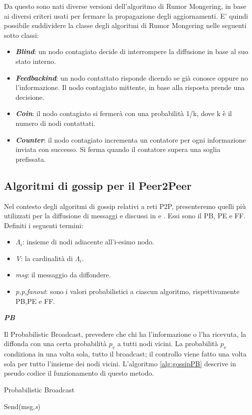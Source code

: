 Da questo sono nati diverse versioni dell'algoritmo di Rumor Mongering, in base ai diversi criteri usati per fermare la propagazione degli aggiornamenti. E' quindi possibile suddividere la classe degli algoritmi di Rumor Mongering nelle seguenti sotto classi:
\begin{itemize}
	\item \textbf{\textit{Blind}}: un nodo contagiato decide di interrompere la diffusione in base al suo stato interno.
	\item \textbf{\textit{Feedbackind}}: un nodo contattato risponde dicendo se già conosce oppure no l'informazione. Il nodo contagiato mittente, in base alla risposta prende una decisione.
	\item \textbf{\textit{Coin}}: il nodo contagiato si fermerà con una probabilità 1/k, dove k è il numero di nodi contattati.
	\item \textbf{\textit{Counter}}: il nodo contagiato incrementa un contatore per ogni informazione inviata con successo. Si ferma quando il contatore supera una soglia prefissata.
\end{itemize}

\subsection{Algoritmi di gossip per il Peer2Peer}
\label{subsec:alg_p2p}
Nel contesto degli algoritmi di gossip relativi a reti \acs{P2P}, presenteremo quelli più utilizzati per la diffusione di messaggi e discussi in \cite{comparisonGAonRT2012} e \cite{comparisonGAonRT2014-ita}. Essi sono il \acf{PB}, \acf{PE} e \acf{FF}. Definiti i seguenti termini:
\begin{itemize}
	\item $ \varLambda_{i} $: insieme di nodi adiacente all'i-esimo nodo.
	\item \textit{V}: la cardinalità di $ \Lambda_{i} $.
	\item \textit{msg}: il messaggio da diffondere.
	\item \textit{p,p,fanout}: sono i valori probabilistici a ciascun algoritmo, rispettivamente PB,PE e FF.
\end{itemize}
\bigskip

\noindent\textbf{\textit{\acf{PB}}}

Il Probabilistic Broadcast, prevedere che chi ha l'informazione o l'ha ricevuta, la diffonda con una certa probabilità $\mathit{p_v}$ a tutti nodi vicini. La probabilità $\mathit{p_v}$ condiziona in una volta sola, tutto il broadcast; il controllo viene fatto una volta sola per tutto l'insieme dei nodi vicini. L'algoritmo \ref{alg:gossipPB} descrive in pseudo codice il funzionamento di questo metodo.
\bigskip
\begin{algorithm}[h]
	\caption{Probabilistic Broadcast}\label{alg:gossipPB}
	\begin{algorithmic}[1]
					\State Send(msg,\emph{s})
				\EndFor
			\EndIf
		\EndFunction
	\end{algorithmic}
\end{algorithm}
\bigskip


